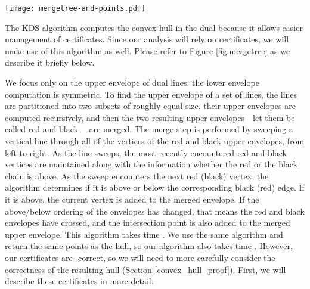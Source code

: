 \documentclass[11pt]{article}
\begin{document}
\begin{figure*}[!ht]  \begin{center}
\texttt{[image: mergetree-and-points.pdf]}
\end{center}
\caption{Top-left: points in primal plane. Bottom-left: dual plane,
  where a point  is represented by the line . Right: the merge tree corresponding to the upper envelope computation in dual space. Leaf nodes are single lines and are omitted in the figure. The certificates proving the top-most merge  are as follows: (i) a chain intersection certificate guaranteeing that  and  and , that is, EH is to the left of AB, EH is below line A, AB is below line H (ii) a diverging certificate guaranteeing that  and , that is, B's slope is less than or equal to G's slope and vertex AB is below line G, (iii) and, another diverging certificate guaranteeing that  and . The certificates are explained in more detail in the paper introducing them \cite{Basch99MobileData}.}

\label{fig:mergetree}
\end{figure*}

The KDS algorithm computes the convex hull in the dual because it allows easier management of certificates.
Since our analysis will rely on certificates, we will make use of
this algorithm as well. Please refer to 
Figure \ref{fig:mergetree} as we describe it briefly below. 

We focus only on the upper envelope of dual lines: the lower envelope
computation is symmetric.  To find the upper envelope of a set of
lines, the lines are partitioned into two subsets of roughly equal
size, their upper envelopes are computed recursively, and then the two
resulting upper envelopes---let them be called red and black--- are
merged.  The merge step is performed by sweeping a vertical line
through all of the vertices of the red and black upper envelopes, from
left to right. As the line sweeps, the most recently encountered red
and black vertices are maintained along with the information whether
the red or the black chain is above. As the sweep encounters the next
red (black) vertex, the algorithm determines if it is above or below
the corresponding black (red) edge. If it is above, the current vertex
is added to the merged envelope.  If the above/below ordering of the
envelopes has changed, that means the red and black envelopes have
crossed, and the intersection point is also added to the merged upper
envelope.  This algorithm takes time 
\cite{ORourke1998book}.  We use the same algorithm and return the same
points as the hull, so our algorithm also takes time .
However, our certificates are -correct, so we will need to more
carefully consider the correctness of the resulting hull (Section
\ref{convex_hull_proof}).  First, we will describe these certificates
in more detail.
\end{document}

